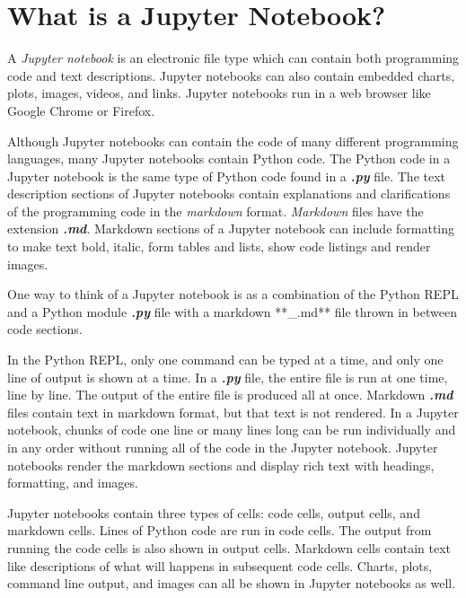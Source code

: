 \documentclass{book}
\begin{document}
    
        \section{What is a Jupyter Notebook?}\label{what-is-a-jupyter-notebook}
    




    
        A \emph{Jupyter notebook} is an electronic file type which can contain
both programming code and text descriptions. Jupyter notebooks can also
contain embedded charts, plots, images, videos, and links. Jupyter
notebooks run in a web browser like Google Chrome or Firefox.
    




    
        Although Jupyter notebooks can contain the code of many different
programming languages, many Jupyter notebooks contain Python code. The
Python code in a Jupyter notebook is the same type of Python code found
in a \textbf{\emph{.py}} file. The text description sections of Jupyter
notebooks contain explanations and clarifications of the programming
code in the \emph{markdown} format. \emph{Markdown} files have the
extension \textbf{\emph{.md}}. Markdown sections of a Jupyter notebook
can include formatting to make text bold, italic, form tables and lists,
show code listings and render images.
    




    
        One way to think of a Jupyter notebook is as a combination of the Python
REPL and a Python module \textbf{\emph{.py}} file with a markdown
**\_.md** file thrown in between code sections.

In the Python REPL, only one command can be typed at a time, and only
one line of output is shown at a time. In a \textbf{\emph{.py}} file,
the entire file is run at one time, line by line. The output of the
entire file is produced all at once. Markdown \textbf{\emph{.md}} files
contain text in markdown format, but that text is not rendered. In a
Jupyter notebook, chunks of code one line or many lines long can be run
individually and in any order without running all of the code in the
Jupyter notebook. Jupyter notebooks render the markdown sections and
display rich text with headings, formatting, and images.
    




    
        Jupyter notebooks contain three types of cells: code cells, output
cells, and markdown cells. Lines of Python code are run in code cells.
The output from running the code cells is also shown in output cells.
Markdown cells contain text like descriptions of what will happens in
subsequent code cells. Charts, plots, command line output, and images
can all be shown in Jupyter notebooks as well.
    
\end{document}
